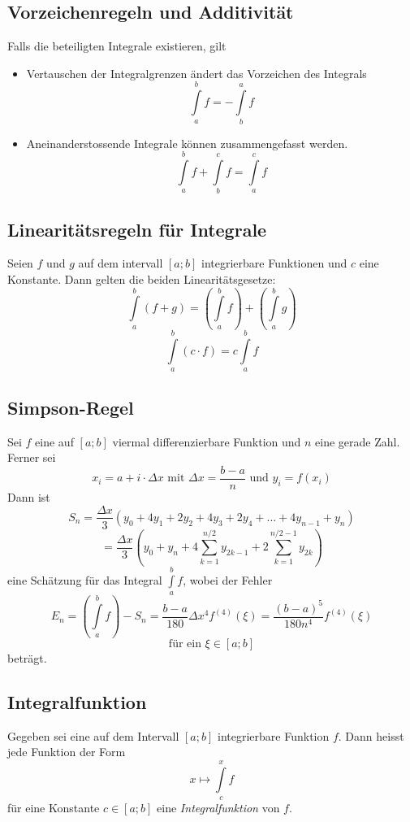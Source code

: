 \documentclass[10pt,a4paper]{article}
\begin{document}
\subsection{Vorzeichenregeln und Additivität}

Falls die beteiligten Integrale existieren, gilt
\begin{itemize}
\item Vertauschen der Integralgrenzen ändert das Vorzeichen des Integrals
$$\int\limits_a^b f = - \int\limits_b^a f$$
\item Aneinanderstossende Integrale können zusammengefasst werden.
$$\int\limits_a^b f + \int\limits_b^c f = \int\limits_a^c f$$
\end{itemize}


\subsection{Linearitätsregeln für Integrale}

Seien $f$ und $g$ auf dem intervall $[a;b]$ integrierbare Funktionen und $c$ eine
Konstante. Dann gelten die beiden Linearitätsgesetze:
$$\int\limits_a^b (f + g) = \left(\int\limits_a^b f\right) + 
    \left(\int\limits_a^b g\right)$$
$$\int\limits_a^b (c \cdot f) = c \int\limits_a^b f$$


\subsection{Simpson-Regel}

Sei $f$ eine auf $[a;b]$ viermal differenzierbare Funktion und $n$ eine gerade Zahl.
Ferner sei
$$x_i = a + i \cdot \Delta x \textrm{ mit } \Delta x = \frac{b-a}{n}
    \textrm{ und } y_i = f(x_i)$$
Dann ist
$$S_n = \frac{\Delta x}{3}(y_0 + 4y_1 + 2y_2 + 4y_3 + 2y_4 + ... + 4y_{n-1} + y_n)$$
$$= \frac{\Delta x}{3}\left(y_0 + y_n + 4 \sum_{k=1}^{n/2} y_{2k-1} 
    + 2 \sum_{k=1}^{n/2-1} y_{2k}\right)$$
eine Schätzung für das Integral $\int\limits_a^b f$, wobei der Fehler
$$E_n = \left(\int\limits_a^b f\right) - S_n = \frac{b-a}{180}\Delta x^4 f^{(4)}(\xi)
    = \frac{(b-a)^5}{180n^4} f^{(4)}(\xi)$$
$$\textrm{für ein } \xi \in [a;b]$$
beträgt.


\subsection{Integralfunktion}

Gegeben sei eine auf dem Intervall $[a;b]$ integrierbare Funktion $f$. Dann heisst
jede Funktion der Form
$$x \mapsto \int\limits_c^x f$$
für eine Konstante $c \in [a;b]$ eine \textit{Integralfunktion} von $f$.
\end{document}
